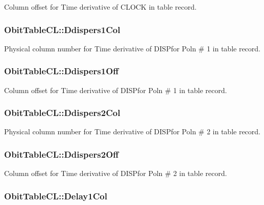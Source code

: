 Column offset for Time derivative of CLOCK in table record. 

\subsubsection{ {\bf Obit\-Table\-CL::Ddispers1Col}}\label{structObitTableCL_o52}


Physical column number for Time derivative of DISPfor Poln \# 1 in table record. 

\subsubsection{ {\bf Obit\-Table\-CL::Ddispers1Off}}\label{structObitTableCL_o51}


Column offset for Time derivative of DISPfor Poln \# 1 in table record. 

\subsubsection{ {\bf Obit\-Table\-CL::Ddispers2Col}}\label{structObitTableCL_o74}


Physical column number for Time derivative of DISPfor Poln \# 2 in table record. 

\subsubsection{ {\bf Obit\-Table\-CL::Ddispers2Off}}\label{structObitTableCL_o73}


Column offset for Time derivative of DISPfor Poln \# 2 in table record. 

\subsubsection{ {\bf Obit\-Table\-CL::Delay1Col}}\label{structObitTableCL_o60}


